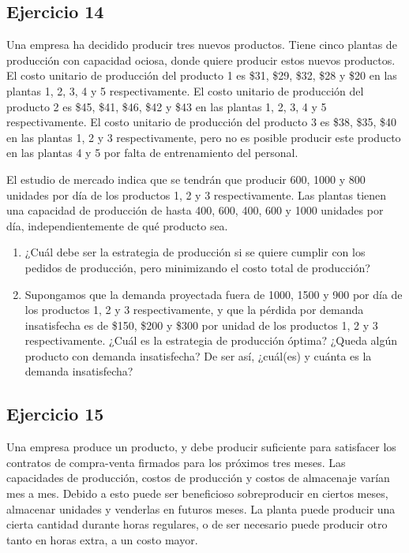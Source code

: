 \documentclass[12pt]{article}
\begin{document}
\subsection*{Ejercicio 14}

Una empresa ha decidido producir tres nuevos productos. Tiene cinco plantas de producción con capacidad ociosa, donde quiere producir estos nuevos productos. El costo unitario de producción del producto 1 es \$31, \$29, \$32, \$28 y \$20 en las plantas 1, 2, 3, 4 y 5 respectivamente. El costo unitario de producción del producto 2 es \$45, \$41, \$46, \$42 y \$43 en las plantas 1, 2, 3, 4 y 5 respectivamente. El costo unitario de producción del producto 3 es \$38, \$35, \$40 en las plantas 1, 2 y 3 respectivamente, pero no es posible producir este producto en las plantas 4 y 5 por falta de entrenamiento del personal.

El estudio de mercado indica que se tendrán que producir 600, 1000 y 800 unidades por día de los productos 1, 2 y 3 respectivamente. Las plantas tienen una capacidad de producción de hasta 400, 600, 400, 600 y 1000 unidades por día, independientemente de qué producto sea.

\begin{enumerate}
\item ¿Cuál debe ser la estrategia de producción si se quiere cumplir con los pedidos de producción, pero minimizando el costo total de producción?
\item Supongamos que la demanda proyectada fuera de 1000, 1500 y 900 por día de los productos 1, 2 y 3 respectivamente, y que la pérdida por demanda insatisfecha es de \$150, \$200 y \$300 por unidad de los productos 1, 2 y 3 respectivamente. ¿Cuál es la estrategia de producción óptima? ¿Queda algún producto con demanda insatisfecha? De ser así, ¿cuál(es) y cuánta es la demanda insatisfecha?
\end{enumerate}

\subsection*{Ejercicio 15}

Una empresa produce un producto, y debe producir suficiente para satisfacer los contratos de compra-venta firmados para los próximos tres meses. Las capacidades de producción, costos de producción y costos de almacenaje varían mes a mes. Debido a esto puede ser beneficioso sobreproducir en ciertos meses, almacenar unidades y venderlas en futuros meses. La planta puede producir una cierta cantidad durante horas regulares, o de ser necesario puede producir otro tanto en horas extra, a un costo mayor.
\end{document}
